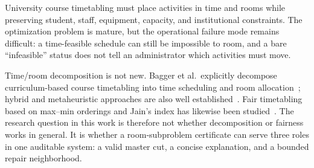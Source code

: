 University course timetabling must place activities in time and rooms while preserving student, staff, equipment, capacity, and institutional constraints.
The optimization problem is mature, but the operational failure mode remains difficult: a time-feasible schedule can still be impossible to room, and a bare ``infeasible'' status does not tell an administrator which activities must move.

Time/room decomposition is not new.
Bagger et al.\ explicitly decompose curriculum-based course timetabling into time scheduling and room allocation~\cite{bagger2018benders}; hybrid and metaheuristic approaches are also well established~\cite{muller2009hybrid,lewis2008metaheuristics,bettinelli2015overview}.
Fair timetabling based on max--min orderings and Jain's index has likewise been studied~\cite{muhlenthaler2013fairness,muhlenthaler2013decomposition}.
The research question in this work is therefore not whether decomposition or fairness works in general.
It is whether a room-subproblem certificate can serve three roles in one auditable system: a valid master cut, a concise explanation, and a bounded repair neighborhood.

